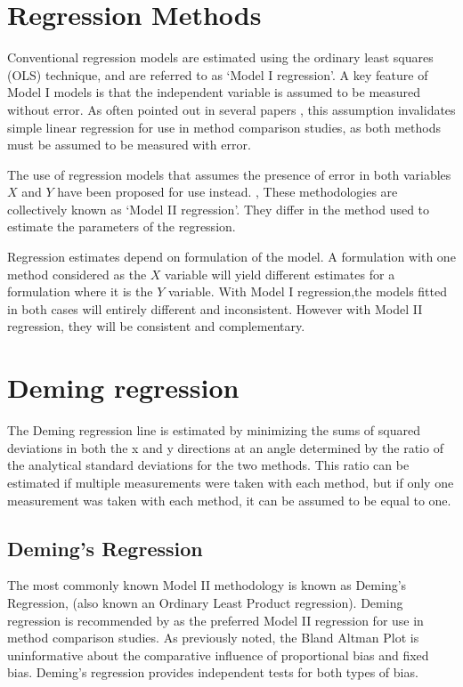 \documentclass[MAIN.tex]{subfiles}
\begin{document}
	
		\section{Regression Methods}
	Conventional regression models are estimated using the ordinary
	least squares (OLS) technique, and are referred to as `Model I
	regression'\citep{CornCoch,ludbrook97}. A key feature of Model I
	models is that the independent variable is assumed to be measured
	without error. As often pointed out in several papers
	\citep{BA83,ludbrook97}, this assumption invalidates simple linear
	regression for use in method comparison studies, as both methods
	must be assumed to be measured with error.
	
	The use of regression models that assumes the presence of error in
	both variables $X$ and $Y$ have been proposed for use instead.
	\citep{CornCoch,ludbrook97}, These methodologies are collectively
	known as `Model II regression'. They differ in the method used to
	estimate the parameters of the regression.
	
	Regression estimates depend on formulation of the model. A
	formulation with one method considered as the $X$ variable will
	yield different estimates for a formulation where it is the $Y$
	variable. With Model I regression,the models fitted in both cases
	will entirely different and inconsistent. However with Model II
	regression, they will be consistent and complementary.

\section*{Deming regression}
The Deming regression line is estimated by minimizing the sums of squared deviations in both the x and y directions at an angle determined by the ratio of the analytical standard deviations for the two methods.
This ratio can be estimated if multiple measurements were taken with each method, but if only one measurement was taken with each method, it can be assumed to be equal to one.
	
	\subsection{Deming's Regression}
	The most commonly known Model II methodology is known as Deming's
	Regression, (also known an Ordinary Least Product regression).
	Deming regression is recommended by \citet*{CornCoch} as the
	preferred Model II regression for use in method comparison
	studies. As previously noted, the Bland Altman Plot is
	uninformative about the comparative influence of proportional bias
	and fixed bias. Deming's regression provides independent tests for
	both types of bias.
	
\end{document}
